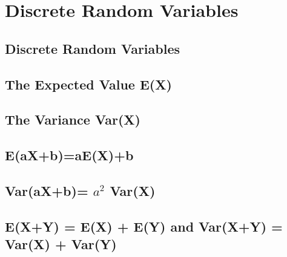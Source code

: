 \documentclass[../alevelmaths.tex]{subfiles}
\begin{document}
\chapter{Discrete Random Variables}
\section{Discrete Random Variables}
\section{The Expected Value E(X)}
\section{The Variance Var(X)}
\section{E(aX+b)=aE(X)+b}
\section{Var(aX+b)= \texorpdfstring{$a^2$}{a squared} Var(X)}
\section{E(X+Y) = E(X) + E(Y) and Var(X+Y) = Var(X) + Var(Y)}
\end{document}
